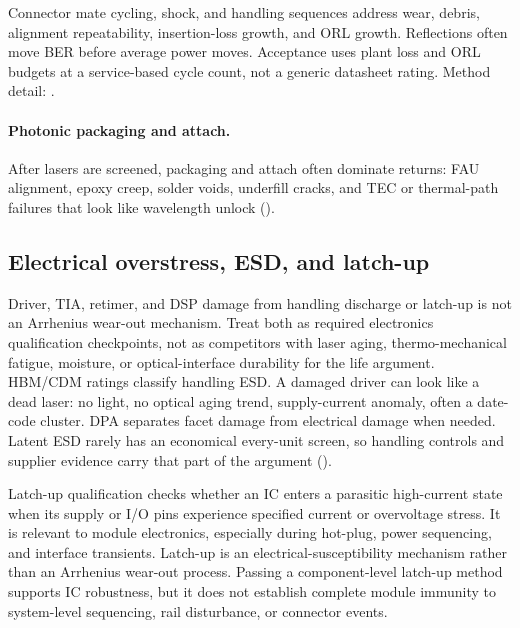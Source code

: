 Connector mate cycling, shock, and handling sequences address wear, debris,
alignment repeatability, insertion-loss growth, and ORL growth. Reflections
often move BER before average power moves. Acceptance uses plant loss and ORL
budgets at a service-based cycle count, not a generic datasheet rating. Method
detail: .

\paragraph{Photonic packaging and attach.}
\label{sec:photonic-packaging}
After lasers are screened, packaging and attach often dominate returns: FAU
alignment, epoxy creep, solder voids, underfill cracks, and TEC or thermal-path
failures that look like wavelength unlock
().

\subsection{Electrical overstress, ESD, and latch-up}

Driver, TIA, retimer, and DSP damage from handling discharge or latch-up is not
an Arrhenius wear-out mechanism. Treat both as required electronics
qualification checkpoints, not as competitors with laser aging,
thermo-mechanical fatigue, moisture, or optical-interface durability for the
life argument.
HBM/CDM ratings classify handling
ESD. A damaged driver can look like a dead laser: no light, no optical aging
trend, supply-current anomaly, often a date-code cluster.
DPA separates facet damage from
electrical damage when needed. Latent ESD rarely has an economical every-unit
screen, so handling controls and supplier evidence carry that part of the
argument ().

Latch-up qualification checks whether an IC enters a parasitic high-current
state when its supply or I/O pins experience specified current or overvoltage
stress. It is relevant to module electronics, especially during hot-plug, power
sequencing, and interface transients. Latch-up is an electrical-susceptibility
mechanism rather than an Arrhenius wear-out process. Passing a component-level
latch-up method supports IC robustness, but it does not establish complete
module immunity to system-level sequencing, rail disturbance, or connector
events.

